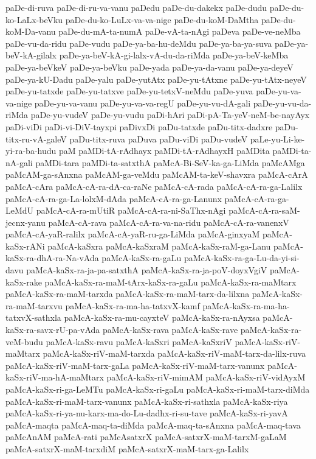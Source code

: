 {paDe-di-ruva
paDe-di-ru-va-vanu
paDedu
paDe-du-dakekx
paDe-dudu
paDe-du-ko-LaLx-beVku
paDe-du-ko-LuLx-va-va-nige
paDe-du-koM-DaMtha
paDe-du-koM-Da-vanu
paDe-du-mA-ta-numA
paDe-vA-ta-nAgi
paDeva
paDe-ve-neMba
paDe-vu-da-ridu
paDe-vudu
paDe-ya-ba-hu-deMdu
paDe-ya-ba-ya-suva
paDe-ya-beV-kA-gilalx
paDe-ya-beV-kA-gi-lalx-vA-du-da-riMda
paDe-ya-beV-keMba
paDe-ya-beVkeV
paDe-ya-beVku
paDe-yada
paDe-ya-da-vanu
paDe-ya-deyeV
paDe-ya-kU-Dadu
paDe-yalu
paDe-yutAtx
paDe-yu-tAtxne
paDe-yu-tAtx-neyeV
paDe-yu-tatxde
paDe-yu-tatxve
paDe-yu-tetxV-neMdu
paDe-yuva
paDe-yu-va-va-nige
paDe-yu-va-vanu
paDe-yu-va-va-regU
paDe-yu-vu-dA-gali
paDe-yu-vu-da-riMda
paDe-yu-vudeV
paDe-yu-vudu
paDi-hAri
paDi-pA-Ta-yeV-neM-be-nayAyx
paDi-viDi
paDi-vi-DiV-tayxpi
paDivxDi
paDu-tatxde
paDu-titx-dadxre
paDu-titx-ru-vA-galeV
paDu-titx-ruva
paDuva
paDu-viDi
paDu-vudeV
paLe-yu-Li-ke-yi-ra-ba-hudu
paM
paMDi-tA-rAdhayx
paMDi-tA-rAdhayxH
paMDita
paMDi-ta-nA-gali
paMDi-tara
paMDi-ta-satxthA
paMcA-Bi-SeV-ka-ga-LiMda
paMcAMga
paMcAM-ga-sAnxna
paMcAM-ga-veMdu
paMcAM-ta-keV-shavxra
paMcA-cArA
paMcA-cAra
paMcA-cA-ra-dA-ca-raNe
paMcA-cA-rada
paMcA-cA-ra-ga-Lalilx
paMcA-cA-ra-ga-La-lolxM-dAda
paMcA-cA-ra-ga-Lanunx
paMcA-cA-ra-ga-LeMdU
paMcA-cA-ra-mUtiR
paMcA-cA-ra-ni-SaThx-nAgi
paMcA-cA-ra-saM-jecnx-yanu
paMcA-cA-rava
paMcA-cA-ra-va-na-ridu
paMcA-cA-ra-vanenxV
paMcA-cA-yaR-ralilx
paMcA-cA-yaR-ru-ga-LiMda
paMcA-ginxyaM
paMcA-kaSx-rANi
paMcA-kaSxra
paMcA-kaSxraM
paMcA-kaSx-raM-ga-Lanu
paMcA-kaSx-ra-dhA-ra-Na-vAda
paMcA-kaSx-ra-gaLu
paMcA-kaSx-ra-ga-Lu-da-yi-si-davu
paMcA-kaSx-ra-ja-pa-satxthA
paMcA-kaSx-ra-ja-poV-doyxVgiV
paMcA-kaSx-rake
paMcA-kaSx-ra-maM-tArx-kaSx-ra-gaLu
paMcA-kaSx-ra-maMtarx
paMcA-kaSx-ra-maM-tarxda
paMcA-kaSx-ra-maM-tarx-da-lilxna
paMcA-kaSx-ra-maM-tarxvu
paMcA-kaSx-ra-ma-ha-tatxvX-kamf
paMcA-kaSx-ra-ma-ha-tatxvX-sathxla
paMcA-kaSx-ra-mu-cayxteV
paMcA-kaSx-ra-nAyxsa
paMcA-kaSx-ra-savx-rU-pa-vAda
paMcA-kaSx-rava
paMcA-kaSx-rave
paMcA-kaSx-ra-veM-budu
paMcA-kaSx-ravu
paMcA-kaSxri
paMcA-kaSxriV
paMcA-kaSx-riV-maMtarx
paMcA-kaSx-riV-maM-tarxda
paMcA-kaSx-riV-maM-tarx-da-lilx-ruva
paMcA-kaSx-riV-maM-tarx-gaLa
paMcA-kaSx-riV-maM-tarx-vanunx
paMcA-kaSx-riV-ma-hA-maMtarx
paMcA-kaSx-riV-mimAM
paMcA-kaSx-riV-vidAyxM
paMcA-kaSx-ri-ga-LeMTu
paMcA-kaSx-ri-gaLu
paMcA-kaSx-ri-maM-tarx-diMda
paMcA-kaSx-ri-maM-tarx-vanunx
paMcA-kaSx-ri-sathxla
paMcA-kaSx-riya
paMcA-kaSx-ri-ya-nu-karx-ma-do-Lu-dadhx-ri-su-tave
paMcA-kaSx-ri-yavA
paMcA-maqta
paMcA-maq-ta-diMda
paMcA-maq-ta-sAnxna
paMcA-maq-tava
paMcAnAM
paMcA-rati
paMcAsatxrX
paMcA-satxrX-maM-tarxM-gaLaM
paMcA-satxrX-maM-tarxdiM
paMcA-satxrX-maM-tarx-ga-Lalilx
}
